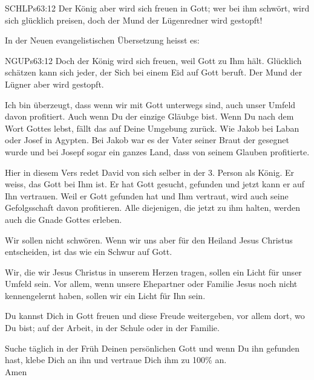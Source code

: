\documentclass[fontsize=16pt]{mybib}
\begin{document}
    \begin{bibelbox}{SCHL}{Ps}{63:12}
        Der König aber wird sich freuen in Gott; wer bei ihm schwört, wird sich glücklich preisen, doch der Mund der Lügenredner wird gestopft!
    \end{bibelbox}
    In der Neuen evangelistischen Übersetzung heisst es:
    \begin{bibelbox}{NGU}{Ps}{63:12}
        Doch der König wird sich freuen, weil Gott zu Ihm hält. Glücklich schätzen kann sich jeder, der Sich bei einem Eid auf Gott beruft. Der Mund der Lügner aber wird gestopft.
    \end{bibelbox}
    \begin{otsblock}
        Ich bin überzeugt, dass wenn wir mit Gott unterwegs sind, auch unser Umfeld davon profitiert. Auch wenn Du der einzige Gläubge bist. Wenn Du nach dem Wort Gottes lebst, fällt das auf Deine Umgebung zurück. Wie Jakob bei Laban oder Josef in Agypten. Bei Jakob war es der Vater seiner Braut der gesegnet wurde und bei Josepf sogar ein ganzes Land, dass von seinem Glauben profitierte.

        Hier in diesem Vers redet David von sich selber in der 3. Person als König. Er weiss, das Gott bei Ihm ist. Er hat Gott gesucht, gefunden und jetzt kann er auf Ihn vertrauen. Weil er Gott gefunden hat und Ihm vertraut, wird auch seine Gefolgsschaft davon profitieren. Alle diejenigen, die jetzt zu ihm halten, werden auch die Gnade Gottes erleben.

        Wir sollen nicht schwören. Wenn wir uns aber für den Heiland Jesus Christus entscheiden, ist das wie ein Schwur auf Gott.
    \end{otsblock}
    \begin{otsblock}
        Wir, die wir Jesus Christus in unserem Herzen tragen, sollen ein Licht für unser Umfeld sein. Vor allem, wenn unsere Ehepartner oder Familie Jesus noch nicht kennengelernt haben, sollen wir ein Licht für Ihn sein.     

        Du kannst Dich in Gott freuen und diese Freude weitergeben, vor allem dort, wo Du bist; auf der Arbeit, in der Schule oder in der Familie.
\end{otsblock}
    Suche täglich in der Früh Deinen persönlichen Gott und wenn Du ihn gefunden hast, klebe Dich an ihn und vertraue Dich ihm zu 100\% an.\\
    {Amen}\\
    \beten
\end{document}
